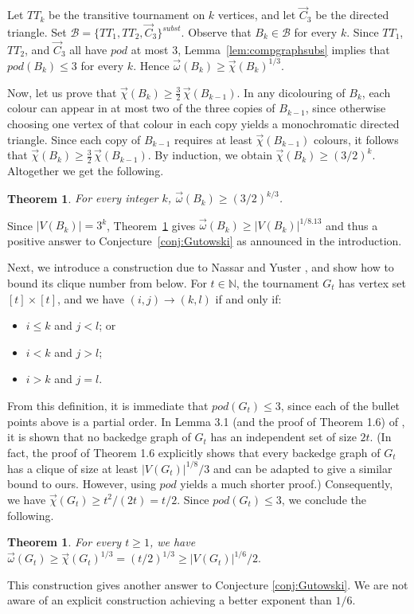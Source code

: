 \documentclass{article}
\newcommand{\dic}{\vec\chi}
\newcommand{\diomega}{\vec\omega}
\renewcommand{\le}{\leqslant}
\newtheorem{theorem}[lemma]{Theorem}
\newcommand{\sophie}[1]{\textcolor{Emerald}{Sophie: #1}}
\begin{document}
Let $TT_k$ be the transitive tournament on $k$ vertices, and let $\vec C_3$ be the directed triangle. Set $\mathcal B=\{TT_1,TT_2,\vec C_3\}^{subst}$. Observe that $B_k\in\mathcal B$ for every $k$. Since $TT_1$, $TT_2$, and $\vec C_3$ all have $pod$ at most $3$, Lemma~\ref{lem:compgraphsubs} implies that $pod(B_k)\le 3$ for every $k$. Hence $\diomega(B_k)\ge \dic(B_k)^{1/3}$.

Now, let us prove that $\dic(B_k)\ge \frac32\,\dic(B_{k-1})$. In any dicolouring of $B_k$, each colour can appear in at most two of the three copies of $B_{k-1}$, since otherwise choosing one vertex of that colour in each copy yields a monochromatic directed triangle. Since each copy of $B_{k-1}$ requires at least $\dic(B_{k-1})$ colours, it follows that $\dic(B_k)\ge \frac32\,\dic(B_{k-1})$. By induction, we obtain $\dic(B_k)\ge (3/2)^k$. Altogether we get the following. 

\begin{theorem}\label{thm:diomega_Bk}
For every integer $k$, $\diomega(B_k)\ge (3/2)^{k/3}$.  
\end{theorem} 

Since $|V(B_k)|=3^k$, Theorem~\ref{thm:diomega_Bk} gives $\diomega(B_k) \geq |V(B_k)|^{1/8.13}$ and thus a positive answer to Conjecture~\ref{conj:Gutowski} as announced in the introduction. 

Next, we introduce a construction due to Nassar and Yuster \cite{nassar2019acyclic}, and show how to bound its clique number from below. For $t \in \mathbb{N}$, the tournament $G_t$ has vertex set $[t] \times [t]$, and we have $(i, j) \rightarrow (k, l)$ if and only if: 
\begin{itemize}
    \item $i \leq k$ and $j < l$; or
    \item $i < k$ and $j > l$; 
    \item $i > k$ and $j = l$. 
\end{itemize}
From this definition, it is immediate that $pod(G_t) \leq 3$, since each of the bullet points above is a partial order. In Lemma 3.1 (and the proof of Theorem 1.6) of \cite{nassar2019acyclic}, it is shown that no backedge graph of $G_t$ has an independent set of size $2t$. (In fact, the proof of Theorem 1.6 explicitly shows that every backedge graph of $G_t$ has a clique of size at least $|V(G_t)|^{1/8}/3$ and can be adapted to give a similar bound to ours. However, using $pod$ yields a much shorter proof.) Consequently, we have $\dic(G_t) \geq t^2 / (2t) = t/2$.  Since $pod(G_t) \leq 3$, we conclude the following. 
\begin{theorem} \label{thm:gt}
    For every $t \geq 1$, we have $\diomega(G_t) \geq \dic(G_t)^{1/3} = (t/2)^{1/3} \geq |V(G_t)|^{1/6}/2.$
\end{theorem} This construction gives another answer to Conjecture \ref{conj:Gutowski}. We are not aware of an explicit construction achieving a better exponent than $1/6$. 
\end{document}

